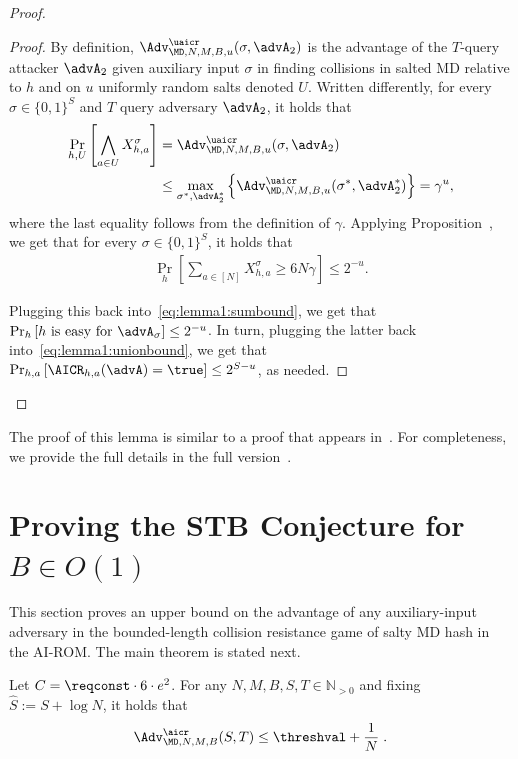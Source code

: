 {\begin{proof}
\begin{proof}
By definition,  $\Adv^{\uaicr}_{\MD,N,M,B,u} (\sigma, \advA_2)$ is the advantage of the $T$-query attacker $\advA_2$ given auxiliary input $\sigma$ in finding collisions in salted MD relative to $h$ and on $u$ uniformly random salts denoted $U$. Written differently, for every $\sigma\in\{0,1\}^S$ and $T$ query adversary $\advA_2$, it holds that 
\begin{align*}
\Pr_{h,U}\left[\bigwedge_{a\in U}X_{h,a}^\sigma\right]&= \Adv^{\uaicr}_{\MD,N,M,B,u} (\sigma, \advA_2) \\ 
& \le \max_{\sigma^*,\advA_2^*} \left\{\Adv^{\uaicr}_{\MD,N,M,B,u} (\sigma^*, \advA^*_2) \right\}  = \gamma^u,
\end{align*}
where the last equality follows from the definition of $\gamma$.
Applying Proposition~, we get that for every $\sigma\in \{0,1\}^S$, it holds that 
\begin{align*}
\Pr_h\left[\sum_{a\in [N]}X^\sigma_{h,a}\geq 6N\gamma\right]\leq 2^{-u}.
\end{align*}

Plugging this back into~\eqref{eq:lemma1:sumbound}, we get that 
$\Pr_h\left[h\text{ is easy for } \advA_\sigma \right] \leq 2^{-u}$. In turn, plugging the latter back into~\eqref{eq:lemma1:unionbound}, we get that $\Pr_{h,a}\left[{\AICR_{h,a}(\advA)}=\true\right] \leq 2^{S-u}$, as needed.
\end{proof}
\end{proof}
}
\ifnum{}
\lemmaone
\else
The proof of this lemma is similar to a proof that appears in~\cite{AkshimaCDW20}. For completeness, we provide the full details in the full version~\cite{full}.
\fi
\section{Proving the STB Conjecture for $B\in O(1)$}\label{sec:comparg}
This section proves an upper bound on the advantage of any auxiliary-input adversary in the bounded-length collision resistance game of salty MD hash in the AI-ROM. The main theorem is stated next. 

\begin{theorem}\label{thm:MDST}
Let $C = \reqconst \cdot 6\cdot e^2$. For any $N,M,B,S,T\in \mathbb{N}_{>0}$ and fixing $\hat S := S + \log N$, it holds that 
\begin{align*}
  \Adv_{\MD,N,M,B}^{\aicr}(S,T) \leq \threshval+\frac{1}{N}\;.
\end{align*}
\end{theorem}

